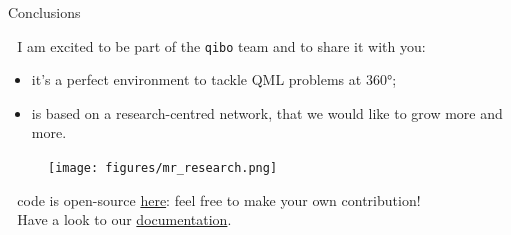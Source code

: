 \documentclass[9pt, xcolor={svgnames}, hyperref={colorlinks, linkcolor=black, citecolor=amethyst, urlcolor=amethyst}]{beamer}
\begin{document}
\begin{frame}{Conclusions}
\small

\faArrowCircleRight\,\, I am excited to be part of the \texttt{qibo} team 
and to share it with you:
\pause
\begin{itemize}[noitemsep]
    \item[\faCogs] it's a perfect environment to tackle QML problems at $360$°;
    \pause
    \item[\faGroup] is based on a research-centred network, that we would like to grow more 
    and more.
\end{itemize}
\pause
\begin{figure}  
\texttt{[image: figures/mr\_research.png]}
\end{figure}

\pause
\vfill
\faGithub\,\, code is open-source \href{https://github.com/qiboteam/qibo}{here}: feel free to make your own contribution!\\
\faBook\,\, Have a look to our \href{https://qibo.science/}{documentation}.
\end{frame}
\end{document}
